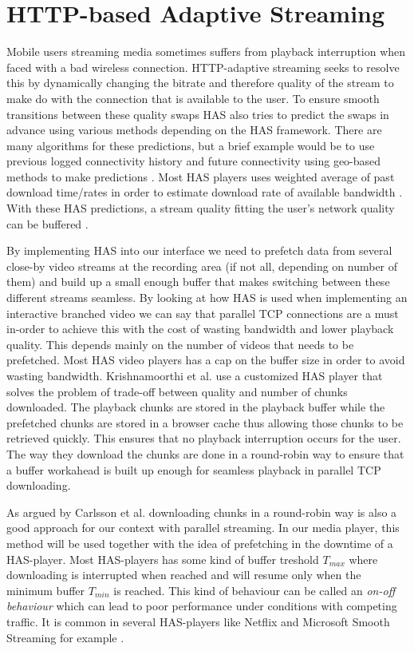\section{HTTP-based Adaptive Streaming}
\label{sec:has}

Mobile users streaming media sometimes suffers from playback interruption when faced with a bad wireless connection. HTTP-adaptive streaming seeks to resolve this by dynamically changing the bitrate and therefore quality of the stream to make do with the connection that is available to the user. To ensure smooth transitions between these quality swaps HAS also tries to predict the swaps in advance using various methods depending on the HAS framework. There are many algorithms for these predictions, but a brief example would be to use previous logged connectivity history and future connectivity using geo-based methods to make predictions \cite{gtube}. Most HAS players uses weighted average of past download time/rates in order to estimate download rate of available bandwidth \cite{qualbranch}. With these HAS predictions, a stream quality fitting the user’s network quality can be buffered \cite{gtube}.

By implementing HAS into our interface we need to prefetch data from several close-by video streams at the recording area (if not all, depending on number of them) and build up a small enough buffer that makes switching between these different streams seamless. By looking at how HAS is used when implementing an interactive branched video we can say that parallel TCP connections are a must in-order to achieve this with the cost of wasting bandwidth and lower playback quality. This depends mainly on the number of videos that needs to be prefetched. Most HAS video players has a cap on the buffer size in order to avoid wasting bandwidth. Krishnamoorthi et al. \cite{qualbranch} use a customized HAS player that solves the problem of trade-off between quality and number of chunks downloaded. The playback chunks are stored in the playback buffer while the prefetched chunks are stored in a browser cache thus allowing those chunks to be retrieved quickly. This ensures that no playback interruption occurs for the user. The way they download the chunks are done in a round-robin way to ensure that a buffer workahead is built up enough for seamless playback in parallel TCP downloading. 

As argued by Carlsson et al. \cite{optimizedprefetching} downloading chunks in a round-robin way is also a good approach for our context with parallel streaming. In our media player, this method will be used together with the idea of prefetching in the downtime of a HAS-player. Most HAS-players has some kind of buffer treshold $T_{max}$ where downloading is interrupted when reached and will resume only when the minimum buffer $T_{min}$ is reached. This kind of behaviour can be called an \textit{on-off behaviour} which can lead to poor performance under conditions with competing traffic. It is common in several HAS-players like Netflix and Microsoft Smooth Streaming for example \cite{bandawarePrefetch}. 

